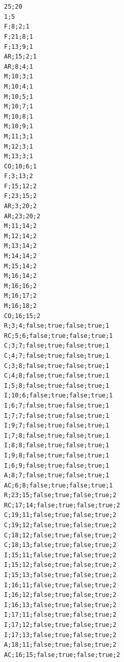 \documentclass[a4paper]{report}
\begin{document}
\chapter{}
\centering
\begin{lstlisting}[basicstyle=\scriptsize\tt, columns=fullflexible, caption=Fichier pour l'état initial présenté dans le livre \it{Le Jeu de la Guerre},label=lst:formatDebord]
25;20
1;5
F;8;2;1
F;21;8;1
F;13;9;1
AR;15;2;1
AR;8;4;1
M;10;3;1
M;10;4;1
M;10;5;1
M;10;7;1
M;10;8;1
M;10;9;1
M;11;3;1
M;12;3;1
M;13;3;1
CO;10;6;1
F;3;13;2
F;15;12;2
F;23;15;2
AR;3;20;2
AR;23;20;2
M;11;14;2
M;12;14;2
M;13;14;2
M;14;14;2
M;15;14;2
M;16;14;2
M;16;16;2
M;16;17;2
M;16;18;2
CO;16;15;2
R;3;4;false;true;false;true;1
RC;5;6;false;true;false;true;1
C;3;7;false;true;false;true;1
C;4;7;false;true;false;true;1
C;3;8;false;true;false;true;1
C;4;8;false;true;false;true;1
I;5;8;false;true;false;true;1
I;10;6;false;true;false;true;1
I;6;7;false;true;false;true;1
I;7;7;false;true;false;true;1
I;9;7;false;true;false;true;1
I;7;8;false;true;false;true;1
I;8;8;false;true;false;true;1
I;9;8;false;true;false;true;1
I;6;9;false;true;false;true;1
A;8;7;false;true;false;true;1
AC;6;8;false;true;false;true;1
R;23;15;false;true;false;true;2
RC;17;14;false;true;false;true;2
C;19;11;false;true;false;true;2
C;19;12;false;true;false;true;2
C;18;12;false;true;false;true;2
C;18;13;false;true;false;true;2
I;15;11;false;true;false;true;2
I;15;12;false;true;false;true;2
I;15;13;false;true;false;true;2
I;16;11;false;true;false;true;2
I;16;12;false;true;false;true;2
I;16;13;false;true;false;true;2
I;17;11;false;true;false;true;2
I;17;12;false;true;false;true;2
I;17;13;false;true;false;true;2
A;18;11;false;true;false;true;2
AC;16;15;false;true;false;true;2
\end{lstlisting}
\end{document}

